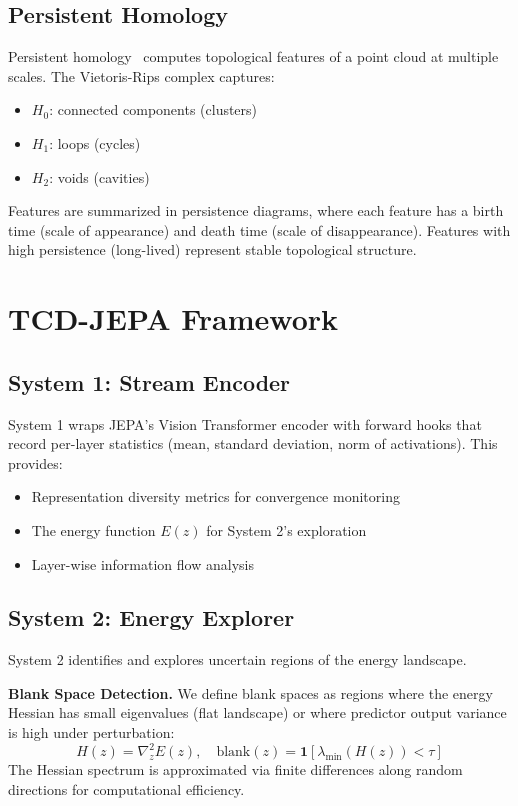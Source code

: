 \documentclass[10pt,twocolumn]{article}
\begin{document}
\subsection{Persistent Homology}

Persistent homology~\citep{edelsbrunner2010computational} computes topological features of a point cloud at multiple scales. The Vietoris-Rips complex captures:
\begin{itemize}
    \item $H_0$: connected components (clusters)
    \item $H_1$: loops (cycles)
    \item $H_2$: voids (cavities)
\end{itemize}
Features are summarized in persistence diagrams, where each feature has a birth time (scale of appearance) and death time (scale of disappearance). Features with high persistence (long-lived) represent stable topological structure.

\section{TCD-JEPA Framework}

\subsection{System 1: Stream Encoder}

System 1 wraps JEPA's Vision Transformer encoder with forward hooks that record per-layer statistics (mean, standard deviation, norm of activations). This provides:
\begin{itemize}
    \item Representation diversity metrics for convergence monitoring
    \item The energy function $E(z)$ for System 2's exploration
    \item Layer-wise information flow analysis
\end{itemize}

\subsection{System 2: Energy Explorer}

System 2 identifies and explores uncertain regions of the energy landscape.

\textbf{Blank Space Detection.} We define blank spaces as regions where the energy Hessian has small eigenvalues (flat landscape) or where predictor output variance is high under perturbation:
\begin{equation}
    H(z) = \nabla^2_z E(z), \quad \text{blank}(z) = \mathbf{1}[\lambda_{\min}(H(z)) < \tau]
\end{equation}
The Hessian spectrum is approximated via finite differences along random directions for computational efficiency.
\end{document}
